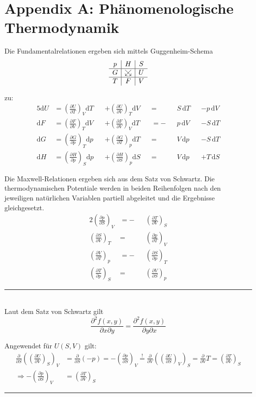 \documentclass{article}
\newcommand{\diff}{\mathrm{d}}
\newcommand{\lr}[1]{\left(#1\right)}
\begin{document}
\newpage


\section{Appendix A: Phänomenologische Thermodynamik}
Die Fundamentalrelationen ergeben sich mittels Guggenheim-Schema
	$$\begin{array}{c|c|c}
			p & H & S \\
		\hline
			G & \mathrel{\ooalign{$\swarrow$\cr $\searrow$}} & U \\
		\hline
			T & F & V
	\end{array}$$

zu:
	\begin{alignat}{5}
		\diff U &= \lr{ \frac{\partial U}{\partial T} }_V\diff T &&+ \lr{ \frac{\partial U}{\partial V} }_T \diff V &&= &&S\,\diff T &&- p\,\diff V \\
		\diff F &= \lr{ \frac{\partial F}{\partial V} }_T \diff V &&+ \lr{ \frac{\partial F}{\partial V} }_V \diff T  &&= -&&p\,\diff V &&- S\,\diff T \\
		\diff G &= \lr{ \frac{\partial G}{\partial p} }_T \diff p &&+ \lr{ \frac{\partial G}{\partial T} }_p \diff T &&= &&V\,\diff p &&- S\,\diff T \\
		\diff H &= \lr{ \frac{\partial H}{\partial p} }_S \diff p &&+ \lr{ \frac{\partial H}{\partial S} }_p \diff S &&= &&V\,\diff p &&+ T\,\diff S
	\end{alignat}

Die Maxwell-Relationen ergeben sich aus dem Satz von Schwartz. Die thermodynamischen Potentiale werden in beiden Reihenfolgen nach den jeweiligen natürlichen Variablen partiell abgeleitet und die Ergebnisse gleichgesetzt.
	\begin{alignat}{2}
		\lr{ \frac{\partial p}{\partial S} }_V &= -&&\lr{ \frac{\partial T}{\partial V} }_S \\
		\lr{ \frac{\partial S}{\partial V} }_T &= &&\lr{ \frac{\partial p}{\partial T} }_V \\
		\lr{ \frac{\partial V}{\partial T} }_p &= -&&\lr{ \frac{\partial S}{\partial p} }_T \\
		\lr{ \frac{\partial T}{\partial p} }_S &= &&\lr{ \frac{\partial V}{\partial S} }_p
	\end{alignat}

\vspace{0.5cm}

{\color{blue}
\hrule
	\\
	Laut dem Satz von Schwartz gilt
		$$\frac{\partial^2f(x,y)}{\partial x\partial y} = \frac{\partial^2f(x,y)}{\partial y\partial x}$$
	
	Angewendet für $U(S,V)$ gilt:
		\begin{align*}
			\frac{\partial}{\partial S} \lr{ \lr{ \frac{\partial U}{\partial V} }_S }_V &= \frac{\partial}{\partial S} (-p) = -\lr{ \frac{\partial p}{\partial S} }_V \stackrel{!}{=} \frac{\partial}{\partial V} \lr{ \lr{ \frac{\partial U}{\partial S} }_V }_S = \frac{\partial}{\partial V} T = \lr{ \frac{\partial T}{\partial V} }_S \\
			\Rightarrow -\lr{ \frac{\partial p}{\partial S} }_V &= \lr{ \frac{\partial T}{\partial V} }_S
		\end{align*}
\hrule
}
\end{document}
